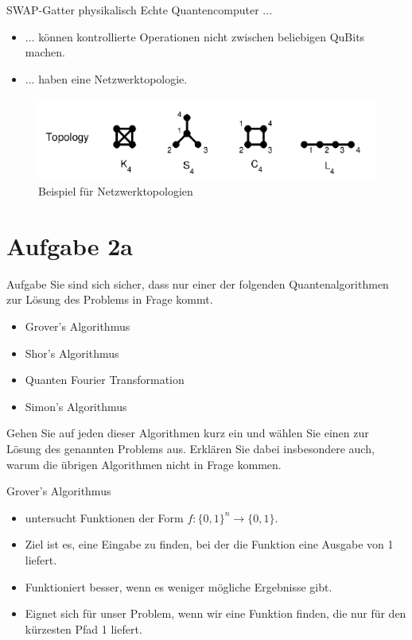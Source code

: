 \documentclass[fleqn,compress,utf8,aspectratio=169,t]{beamer}
\begin{document}
\begin{frame}{SWAP-Gatter physikalisch}
Echte Quantencomputer ...
\begin{itemize}
	\item ... können kontrollierte Operationen nicht zwischen beliebigen QuBits machen.
	\item ... haben eine Netzwerktopologie.
\end{itemize}
\begin{figure}
	\centering
	\includegraphics[height=.3\textheight]{images/1d-topologie.png}
	\caption{Beispiel für Netzwerktopologien}
\end{figure}
\end{frame}

\section{Aufgabe 2a}

\begin{frame}{Aufgabe}
Sie sind sich sicher, dass nur einer der folgenden Quantenalgorithmen zur
Lösung des Problems in Frage kommt.
\begin{itemize}
	\item Grover’s Algorithmus
	\item Shor’s Algorithmus
	\item Quanten Fourier Transformation
	\item Simon’s Algorithmus
\end{itemize}
Gehen Sie auf jeden dieser Algorithmen kurz ein und wählen Sie einen zur Lösung des
genannten Problems aus. Erklären Sie dabei insbesondere auch, warum die übrigen
Algorithmen nicht in Frage kommen.
\end{frame}

\begin{frame}{Grover's Algorithmus}
\begin{itemize}
	\item untersucht Funktionen der Form $f: \{0, 1\}^n \rightarrow \{0, 1\}$.
	\item Ziel ist es, eine Eingabe zu finden, bei der die Funktion eine Ausgabe von 1 liefert.
	\item Funktioniert besser, wenn es weniger mögliche Ergebnisse gibt.
	\item Eignet sich für unser Problem, wenn wir eine Funktion finden, die nur für den kürzesten Pfad 1 liefert.
\end{itemize}	
\end{frame}
\end{document}
